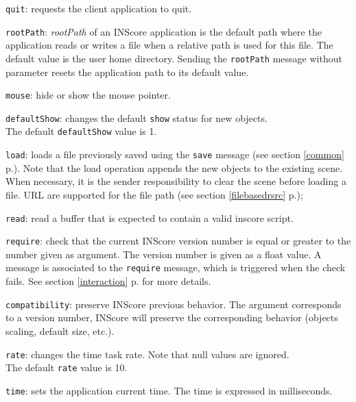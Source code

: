 \documentclass[a4paper,twoside]{report}
\newcommand{\fullref}[1]	{\ref{#1} p.\pageref{#1}}
\newcommand{\OSC}[1]		{\texttt{#1}}
\let\olditemize\itemize
\let\oldenditemize\enditemize
\renewenvironment{itemize} 	{\olditemize \setlength{\itemsep}{1mm}}{\oldenditemize}
\begin{document}
\begin{itemize}
\item \OSC{quit}: requests the client application to quit.

\item \OSC{rootPath}: \emph{rootPath} of an INScore application is the default path where the application reads or writes a file when a relative path is used for this file. The default value is the user home directory. Sending the \OSC{rootPath} message without parameter resets the application path to its default value.

\item \OSC{mouse}: hide or show the mouse pointer.

\item \OSC{defaultShow}: changes the default \OSC{show} status for new objects. \\
The default \OSC{defaultShow} value is 1.

\item \OSC{load}: loads a file previously saved using the \OSC{save} message (see section \fullref{common}). Note that the load operation appends the new objects to the existing scene. When necessary, it is the sender responsibility to clear the scene before loading a file. URL are supported for the file path (see section \fullref{filebasedrsrc});

\item \OSC{read}: read a buffer that is expected to contain a valid inscore script.

\item \OSC{require}: check that the current INScore version number is equal or greater to the number given as argument. The version number is given as a float value. A message is associated to the \OSC{require} message, which is triggered when the check fails. See section \fullref{interaction} for more details.

\item \OSC{compatibility}: preserve INScore previous behavior. The argument corresponds to a version number, INScore will preserve the corresponding behavior (objects scaling, default size, etc.).

\item \OSC{rate}: changes the time task rate. Note that null values are ignored.\\
The default \OSC{rate} value is 10.

\item \OSC{time}: sets the application current time. The time is expressed in milliseconds.


\end{itemize}
\end{document}

